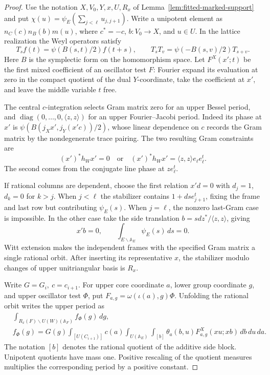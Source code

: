 \begin{proof}
Use the notation \(X,V_0,Y,x,U,R_x\) of
Lemma~\ref{lem:fitted-marked-support} and put
\(\chi(u)=\psi_E(\sum_{j<\ell}u_{j,j+1})\).
Write a unipotent element as \(n_C(c)n_B(b)m(u)\), where
\(c^*=-c\), \(b:V_0\to X\), and \(u\in U\).
In the lattice realization the Weyl operators satisfy
\[
 T_s f(t)=\psi(B(s,t)/2)f(t+s),\qquad
 T_sT_v=\psi(-B(s,v)/2)T_{s+v}.
\]
Here \(B\) is the symplectic form on the homomorphism space.
Let \(F^X(x';t)\) be the first mixed coefficient of an oscillator
test \(F\): Fourier expand its evaluation at zero in the compact
quotient of the dual \(Y\)-coordinate, take the coefficient at
\(x'\), and leave the middle variable \(t\) free.

The central \(c\)-integration selects Gram matrix zero for an upper
Bessel period, and \(\operatorname{diag}(0,\ldots,0,\langle z,z\rangle)\)
for an upper Fourier--Jacobi period. Indeed its phase at \(x'\)
is \(\psi(B(j_Xx',j_Y(x'c))/2)\), whose linear dependence on
\(c\) records the Gram matrix by the nondegenerate trace pairing.
The two resulting Gram constraints are
\[
 (x')^*h_W x'=0\quad\text{or}\quad (x')^*h_W x'=\langle z,z\rangle e_\ell e_\ell^t.
\]
The second comes from the conjugate line phase at \(ze_\ell^t\).

If rational columns are dependent, choose the first relation
\(x'd=0\) with \(d_j=1\), \(d_k=0\) for \(k>j\). When \(j<\ell\)
the stabilizer contains \(1+dse_{j+1}^t\), fixing the frame and
last row but contributing \(\psi_E(s)\). When \(j=\ell\), the
nonzero last-Gram case is impossible. In the other case take the
side translation \(b=sdz^*/\langle z,z\rangle\), giving
\[
 x'b=0,\qquad \int_{E\backslash\mathbb A_E}\psi_E(s)\,ds=0 .
\]
Witt extension makes the independent frames with the specified
Gram matrix a single rational orbit. After inserting its
representative \(x\), the stabilizer modulo changes of upper
unitriangular basis is \(R_x\).

Write \(G=G_i,\ c=c_{i+1}\). For upper core coordinate \(a\), lower
group coordinate \(g\), and upper oscillator test \(\Phi\), put
\(F_{a,g}=\omega(\iota(a),g)\Phi\). Unfolding the rational orbit
writes the upper period as
\begin{align*}
 &\int_{R_x(F)\backslash U(W)(\mathbb A_F)} f_\Phi(g)\,dg,\\
 & f_\Phi(g)=G(g)\int_{[U(C_{i+1})]}c(a)
  \int_{U(\mathbb A_E)}\int_{[b]}\theta_a(b,u)
          F_{a,g}^X(xu;xb)\,db\,du\,da .
\end{align*}
The notation \([b]\) denotes the rational quotient of the additive
side block. Unipotent quotients have mass one. Positive rescaling
of the quotient measures multiplies the corresponding period by
a positive constant.


\end{proof}
